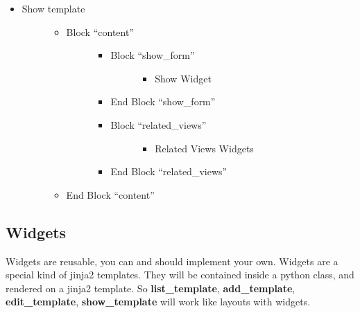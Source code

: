 \documentclass[letterpaper,10pt,english]{sphinxmanual}
\begin{document}
\begin{itemize}
\item {} \begin{description}
\item[{Show template}] \leavevmode\begin{itemize}
\item {} \begin{description}
\item[{Block ``content''}] \leavevmode\begin{itemize}
\item {} \begin{description}
\item[{Block ``show\_form''}] \leavevmode\begin{itemize}
\item {} 
Show Widget

\end{itemize}

\end{description}

\item {} 
End Block ``show\_form''

\item {} \begin{description}
\item[{Block ``related\_views''}] \leavevmode\begin{itemize}
\item {} 
Related Views Widgets

\end{itemize}

\end{description}

\item {} 
End Block ``related\_views''

\end{itemize}

\end{description}

\item {} 
End Block ``content''

\end{itemize}

\end{description}

\end{itemize}


\subsection{Widgets}
\label{templates:widgets}
Widgets are reusable, you can and should implement your own. Widgets are a special kind of jinja2
templates. They will be contained inside a python class, and rendered on a jinja2 template. So
\textbf{list\_template}, \textbf{add\_template}, \textbf{edit\_template}, \textbf{show\_template} will work like layouts
with widgets.
\end{document}
